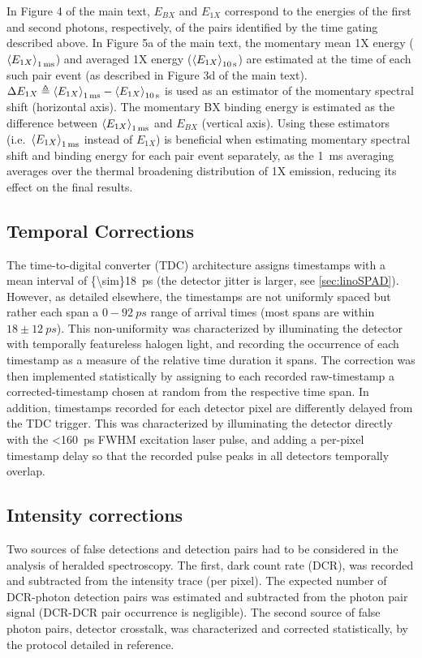 \documentclass[journal=nalefd, manuscript=letter, layout=twocolumn]{achemso}
\begin{document}
In Figure 4 of the main text, $E_{BX}$ and $E_{1X}$ correspond to the energies of the first and second photons, respectively, of the pairs identified by the time gating described above. In Figure 5a of the main text, the momentary mean 1X energy ($\ev{E_{1X}}_{\SI{1}{ms}}$) and averaged 1X energy ($\ev{E_{1X}}_{\SI{10}{s}}$) are estimated at the time of each such pair event (as described in Figure 3d of the main text). $\Delta E_{1X}\triangleq \expval{E_{1X}}_{\SI{1}{ms}}-\expval{E_{1X}}_{\SI{10}{s}}$ is used as an estimator of the momentary spectral shift (horizontal axis). The momentary BX binding energy is estimated as the difference between $\ev{E_{1X}}_{\SI{1}{ms}}$ and $E_{BX}$ (vertical axis). Using these estimators (i.e.\ $\ev{E_{1X}}_{\SI{1}{ms}}$ instead of $E_{1X}$) is beneficial when estimating momentary spectral shift and binding energy for each pair event separately, as the \SI{1}{ms} averaging averages over the thermal broadening distribution of 1X emission, reducing its effect on the final results.

\subsection{Temporal Corrections} The time-to-digital converter (TDC) architecture assigns timestamps with a mean interval of \SI{{\sim}18}{ps} (the detector jitter is larger, see \autoref{sec:linoSPAD}). However, as detailed elsewhere\cite{Burri2017}, the timestamps are not uniformly spaced but rather each span a $0-\SI{92}{ps}$ range of arrival times (most spans are within $18\pm\SI{12}{ps}$). This non-uniformity was characterized by illuminating the detector with temporally featureless halogen light, and recording the occurrence of each timestamp as a measure of the relative time duration it spans. The correction was then implemented statistically by assigning to each recorded raw-timestamp a corrected-timestamp chosen at random from the respective time span. In addition, timestamps recorded for each detector pixel are differently delayed from the TDC trigger. This was characterized by illuminating the detector directly with the \SI{<160}{ps} FWHM excitation laser pulse, and adding a per-pixel timestamp delay so that the recorded pulse peaks in all detectors temporally overlap.

\subsection{Intensity corrections} Two sources of false detections and detection pairs had to be considered in the analysis of heralded spectroscopy. The first, dark count rate (DCR), was recorded and subtracted from the intensity trace (per pixel). The expected number of DCR-photon detection pairs was estimated and subtracted from the photon pair signal (DCR-DCR pair occurrence is negligible). The second source of false photon pairs, detector crosstalk, was characterized and corrected statistically, by the protocol detailed in reference\cite{Lubin2019}.
\end{document}
